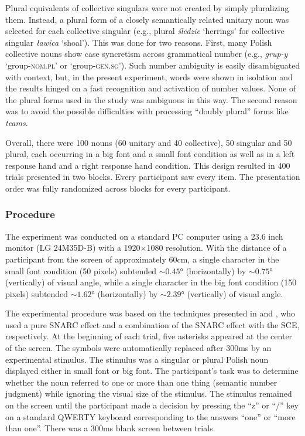 \documentclass[output=paper]{langscibook}
\begin{document}
Plural equivalents of collective singulars were not created by simply pluralizing them. Instead, a plural form of a closely semantically related unitary noun was selected for each collective singular (e.g., plural \textit{śledzie} ‘herrings’ for collective singular \textit{ławica} ‘shoal’). This was done for two reasons. First, many Polish collective nouns show case syncretism across grammatical number (e.g., \mbox{\textit{grup-y}} ‘group-\textsc{nom.pl}’ or ‘group-\textsc{gen.sg}’). Such number ambiguity is easily disambiguat\-ed with context, but, in the present experiment, words were shown in isolation and the results hinged on a fast recognition and activation of number values. None of the plural forms used in the study was ambiguous in this way. The second reason was to avoid the possible difficulties with processing “doubly plural” forms like \textit{teams}. 

Overall, there were 100 nouns (60 unitary and 40 collective), 50 singular and 50 plural, each occurring in a big font and a small font condition as well as in a left response hand and a right response hand condition. This design resulted in 400 trials presented in two blocks. Every participant saw every item. The presentation order was fully randomized across blocks for every participant.

\subsubsection{Procedure}
The experiment was conducted on a standard PC computer using a 23.6 inch monitor (LG 24M35D-B) with a 1920×1080 resolution. With the distance of a participant from the screen of approximately 60cm, a single character in the small font condition (50 pixels) subtended $\sim0.45°$ (horizontally) by $\sim0.75°$ (vertically) of visual angle, while a single character in the big font condition (150 pixels) subtended $\sim1.62°$ (horizontally) by $\sim2.39°$ (vertically) of visual angle.

The experimental procedure was based on the techniques presented in \citet{rottgerGrammaticalNumberElicits2015} and  \citet{fitousiRoleParityPhysical2009}, who used a pure SNARC effect and a combination of the SNARC effect with the SCE, respectively. At the beginning of each trial, five asterisks appeared at the center of the screen. The symbols were automatically replaced after 300ms by an experimental stimulus. The stimulus was a singular or plural Polish noun displayed either in small font or big font. The participant’s task was to determine whether the noun referred to one or more than one thing (semantic number judgment) while ignoring the visual size of the stimulus. The stimulus remained on the screen until the participant made a decision by pressing the “z” or “/” key on a standard QWERTY keyboard corresponding to the answers “one” or “more than one”. There was a 300ms blank screen between trials.
\end{document}

